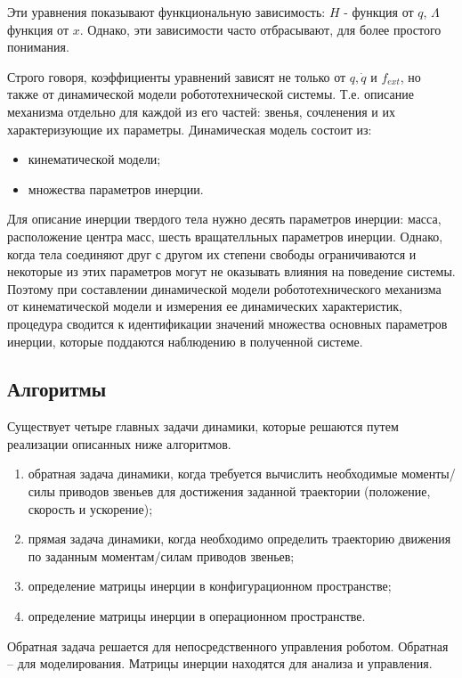 Эти уравнения показывают функциональную зависимость: $H$ - функция от $q$, $\Lambda$ функция от $x$. Однако, эти зависимости часто отбрасывают, для более простого понимания. 

Строго говоря, коэффициенты уравнений зависят не только от $q, \dot q$ и $f_{ext}$, но также от динамической модели робототехнической системы.
Т.е. описание механизма отдельно для каждой из его частей: звенья, сочленения и их характеризующие их параметры. Динамическая модель состоит из:

\begin{itemize}
\item кинематической модели;
\item множества параметров инерции.
\end{itemize}

Для описание инерции твердого тела нужно десять параметров инерции: масса, расположение центра масс, шесть вращателльных параметров инерции. Однако, когда тела соединяют друг с другом их степени свободы ограничиваются и некоторые из этих параметров могут не оказывать влияния на поведение системы. Поэтому при составлении динамической модели робототехнического механизма от кинематической модели и измерения ее динамических характеристик, процедура сводится к идентификации значений множества основных параметров инерции, которые поддаются наблюдению в полученной системе.


\subsection{Алгоритмы}

Существует четыре главных задачи динамики, которые решаются путем реализации описанных ниже алгоритмов. 
\begin{enumerate}
\item обратная задача динамики, когда требуется вычислить необходимые моменты/силы приводов звеньев для достижения заданной траектории (положение, скорость и ускорение);
\item прямая задача динамики, когда необходимо определить траекторию движения по заданным моментам/силам приводов звеньев;
\item определение матрицы инерции в конфигурационном пространстве;
\item определение матрицы инерции в операционном пространстве.
\end{enumerate}

Обратная задача решается для непосредственного управления роботом. Обратная -- для моделирования. Матрицы инерции находятся для анализа и управления.

